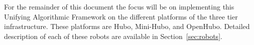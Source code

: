 For the remainder of this document the focus will be on implementing this Unifying Algorithmic Framework on the different platforms of the three tier infrastructure.
These platforms are Hubo, Mini-Hubo, and OpenHubo.  
Detailed description of each of these robots are available in Section~\ref{sec:robots}.








































